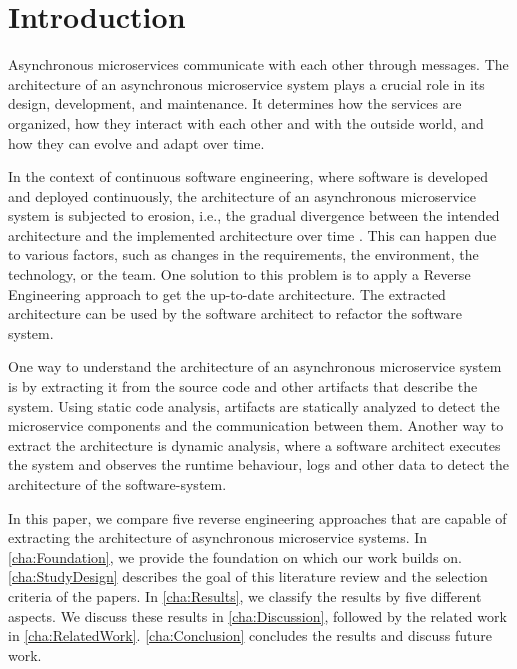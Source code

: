 
\section{Introduction}
\label{cha:Introduction}
Asynchronous microservices communicate with each other through messages.
The architecture of an asynchronous microservice system plays a crucial role in its design, development, and maintenance.
It determines how the services are organized, how they interact with each other and with the outside world, and how they can evolve and adapt over time.

In the context of continuous software engineering, where software is developed and deployed continuously, the architecture of an asynchronous microservice system is subjected to erosion, i.e., the gradual divergence between the intended architecture and the implemented architecture over time \cite{DESILVA2012132}.
This can happen due to various factors, such as changes in the requirements, the environment, the technology, or the team.
One solution to this problem is to apply a Reverse Engineering approach to get the up-to-date architecture.
The extracted architecture can be used by the software architect to refactor the software system.

One way to understand the architecture of an asynchronous microservice system is by extracting it from the source code and other artifacts that describe the system.
Using static code analysis, artifacts are statically analyzed to detect the microservice components and the communication between them.
Another way to extract the architecture is dynamic analysis, where a software architect executes the system and observes the runtime behaviour, logs and other data to detect the architecture of the software-system.

In this paper, we compare five reverse engineering approaches that are capable of extracting the architecture of asynchronous microservice systems.
In \autoref{cha:Foundation}, we provide the foundation on which our work builds on.
\autoref{cha:StudyDesign} describes the goal of this literature review and the selection criteria of the papers.
In \autoref{cha:Results}, we classify the results by five different aspects.
We discuss these results in \autoref{cha:Discussion}, followed by the related work in \autoref{cha:RelatedWork}.
\autoref{cha:Conclusion} concludes the results and discuss future work.
